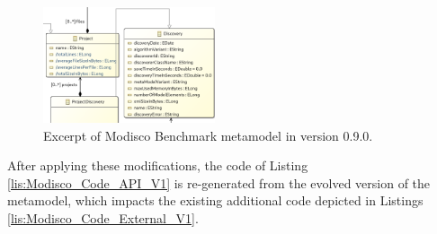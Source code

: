 \begin{figure}
	
	\centering
	\includegraphics[width=0.45\textwidth]{./pics/chapter3pics/example.PNG}
	\caption{Excerpt of Modisco Benchmark metamodel in version 0.9.0.}
	\label{fig: BMM}
\end{figure}



After applying these modifications, the code of Listing \ref{lis:Modisco_Code_API_V1} is re-generated from the evolved version of the metamodel, which impacts the existing additional code depicted in Listings \ref{lis:Modisco_Code_External_V1}. 

